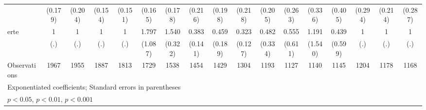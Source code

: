 {\begin{tabular}{l*{16}{c}}
                    &     (0.179)         &     (0.204)         &     (0.154)         &     (0.151)         &     (0.165)         &     (0.178)         &     (0.216)         &     (0.198)         &     (0.218)         &     (0.205)         &     (0.263)         &     (0.336)         &     (0.405)         &     (0.294)         &     (0.214)         &     (0.287)         \\
[1em]
erte                &           1         &           1         &           1         &           1         &       1.797         &       1.540\sym{*}  &       0.383\sym{**} &       0.459         &       0.323\sym{**} &       0.482         &       0.555         &       1.191         &       0.439         &           1         &           1         &           1         \\
                    &         (.)         &         (.)         &         (.)         &         (.)         &     (1.087)         &     (0.322)         &     (0.141)         &     (0.189)         &     (0.127)         &     (0.334)         &     (0.611)         &     (1.540)         &     (0.599)         &         (.)         &         (.)         &         (.)         \\
\hline
Observations        &        1967         &        1955         &        1887         &        1813         &        1729         &        1538         &        1454         &        1429         &        1304         &        1193         &        1127         &        1140         &        1145         &        1204         &        1178         &        1168         \\
\hline\hline
\multicolumn{17}{l}{\footnotesize Exponentiated coefficients; Standard errors in parentheses}\\
\multicolumn{17}{l}{\footnotesize \sym{*} \(p<0.05\), \sym{**} \(p<0.01\), \sym{***} \(p<0.001\)}\\
\end{tabular}
}
